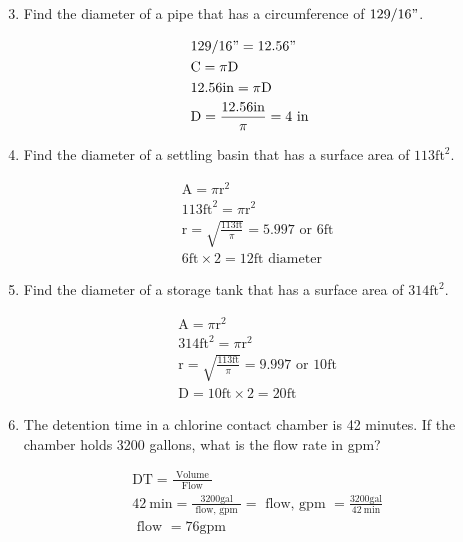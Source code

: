 \begin{enumerate}
  \setcounter{enumi}{2}
  \item Find the diameter of a pipe that has a circumference of $129 / 16 "$.
\end{enumerate}
$$
\begin{aligned}
&129 / 16 "=12.56 " \\
&\mathrm{C}=\pi \mathrm{D} \\
&12.56 \mathrm{in}=\pi \mathrm{D} \\
&\mathrm{D}=\frac{12.56 \mathrm{in}}{\pi}=4 \text { in }
\end{aligned}
$$

\begin{enumerate}
  \setcounter{enumi}{3}
  \item Find the diameter of a settling basin that has a surface area of $113 \mathrm{ft}^{2}$.
\end{enumerate}
$$
\begin{aligned}
&\mathrm{A}=\pi \mathrm{r}^{2} \\
&113 \mathrm{ft}^{2}=\pi \mathrm{r}^{2} \\
&\mathrm{r}=\sqrt{\frac{113 \mathrm{ft}}{\pi}}=5.997 \text { or } 6 \mathrm{ft} \\
&6 \mathrm{ft} \times 2=12 \mathrm{ft} \text { diameter }
\end{aligned}
$$

\begin{enumerate}
  \setcounter{enumi}{4}
  \item Find the diameter of a storage tank that has a surface area of $314 \mathrm{ft}^{2}$.
\end{enumerate}
$$
\begin{aligned}
&\mathrm{A}=\pi \mathrm{r}^{2} \\
&314 \mathrm{ft}^{2}=\pi \mathrm{r}^{2} \\
&\mathrm{r}=\sqrt{\frac{113 \mathrm{ft}}{\pi}}=9.997 \text { or } 10 \mathrm{ft} \\
&\mathrm{D}=10 \mathrm{ft} \times 2=20 \mathrm{ft}
\end{aligned}
$$

\begin{enumerate}
  \setcounter{enumi}{5}
  \item The detention time in a chlorine contact chamber is 42 minutes. If the chamber holds 3200 gallons, what is the flow rate in gpm?
\end{enumerate}
$$
\begin{aligned}
&\mathrm{DT}=\frac{\text { Volume }}{\text { Flow }} \\
&42 \mathrm{~min}=\frac{3200 \mathrm{gal}}{\text { flow, gpm }}=\text { flow, gpm }=\frac{3200 \mathrm{gal}}{42 \mathrm{~min}} \\
&\text { flow }=76 \mathrm{gpm}
\end{aligned}
$$

